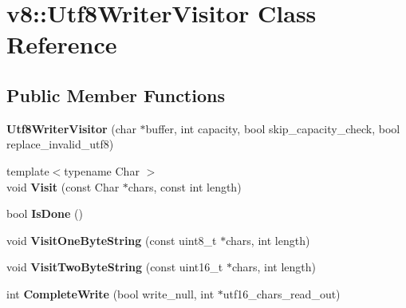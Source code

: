 \hypertarget{classv8_1_1_utf8_writer_visitor}{}\section{v8\+:\+:Utf8\+Writer\+Visitor Class Reference}
\label{classv8_1_1_utf8_writer_visitor}
\subsection*{Public Member Functions}
\begin{DoxyCompactItemize}
\item 
{\bfseries Utf8\+Writer\+Visitor} (char $\ast$buffer, int capacity, bool skip\+\_\+capacity\+\_\+check, bool replace\+\_\+invalid\+\_\+utf8)\hypertarget{classv8_1_1_utf8_writer_visitor_a3694f00cd1412b382316d2e5d4702a95}{}\label{classv8_1_1_utf8_writer_visitor_a3694f00cd1412b382316d2e5d4702a95}

\item 
{\footnotesize template$<$typename Char $>$ }\\void {\bfseries Visit} (const Char $\ast$chars, const int length)\hypertarget{classv8_1_1_utf8_writer_visitor_a73670ab93ce35d25d59d586ed991c3f2}{}\label{classv8_1_1_utf8_writer_visitor_a73670ab93ce35d25d59d586ed991c3f2}

\item 
bool {\bfseries Is\+Done} ()\hypertarget{classv8_1_1_utf8_writer_visitor_af6feff57948c678630eff22c27b08ff4}{}\label{classv8_1_1_utf8_writer_visitor_af6feff57948c678630eff22c27b08ff4}

\item 
void {\bfseries Visit\+One\+Byte\+String} (const uint8\+\_\+t $\ast$chars, int length)\hypertarget{classv8_1_1_utf8_writer_visitor_a8853146988d0c7f9383c7efcbc243678}{}\label{classv8_1_1_utf8_writer_visitor_a8853146988d0c7f9383c7efcbc243678}

\item 
void {\bfseries Visit\+Two\+Byte\+String} (const uint16\+\_\+t $\ast$chars, int length)\hypertarget{classv8_1_1_utf8_writer_visitor_adb4582dcbadea98625a7097edae60fff}{}\label{classv8_1_1_utf8_writer_visitor_adb4582dcbadea98625a7097edae60fff}

\item 
int {\bfseries Complete\+Write} (bool write\+\_\+null, int $\ast$utf16\+\_\+chars\+\_\+read\+\_\+out)\hypertarget{classv8_1_1_utf8_writer_visitor_a3e5ed708404a4e97695ff679184c4fdd}{}\label{classv8_1_1_utf8_writer_visitor_a3e5ed708404a4e97695ff679184c4fdd}

\end{DoxyCompactItemize}
